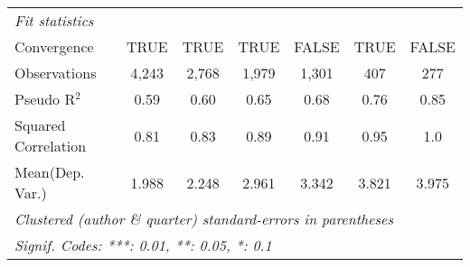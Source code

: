\begin{tabular}{lcccccc}
   \midrule
   \emph{Fit statistics}\\
   Convergence                                                &TRUE           & TRUE          & TRUE         & FALSE         & TRUE         & FALSE\\  
   Observations                                               & 4,243         & 2,768         & 1,979        & 1,301         & 407          & 277\\  
   Pseudo R$^2$                                               & 0.59          & 0.60          & 0.65         & 0.68          & 0.76         & 0.85\\  
   Squared Correlation                                        & 0.81          & 0.83          & 0.89         & 0.91          & 0.95         & 1.0\\  
Mean(Dep. Var.) & 1.988 & 2.248 & 2.961 & 3.342 & 3.821 & 3.975 \\
   \midrule \midrule
   \multicolumn{7}{l}{\emph{Clustered (author \& quarter) standard-errors in parentheses}}\\
   \multicolumn{7}{l}{\emph{Signif. Codes: ***: 0.01, **: 0.05, *: 0.1}}\\
\end{tabular}
\par\endgroup

